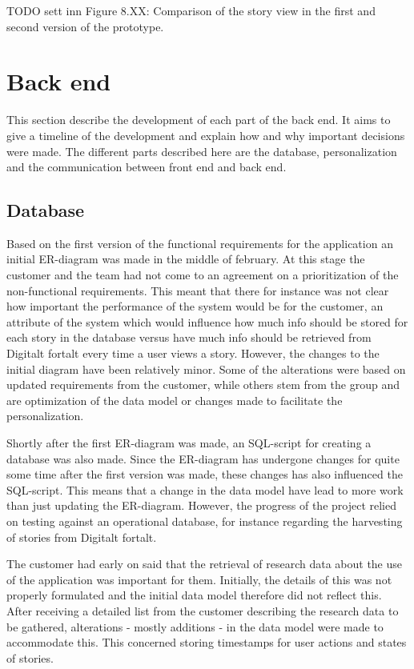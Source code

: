 TODO sett inn Figure 8.XX: Comparison of the story view in the first and second version of the prototype.\newline

\section{Back end}

This section describe the development of each part of the back end. It aims to give a timeline of the development and explain how and why important decisions were made. The different parts described here are the database, personalization and the communication between front end and back end. 

\subsection{Database}

Based on the first version of the functional requirements for the application an initial ER-diagram was made in the middle of february. At this stage the customer and the team had not come to an agreement on a prioritization of the non-functional requirements. This meant that there for instance was not clear how important the performance of the system would be for the customer, an attribute of the system which would influence how much info should be stored for each story in the database versus have much info should be retrieved from Digitalt fortalt every time a user views a story. However, the changes to the initial diagram have been relatively minor. Some of the alterations were based on updated requirements from the customer, while others stem from the group and are optimization of the data model or changes made to facilitate the personalization. \newline

Shortly after the first ER-diagram was made, an SQL-script for creating a database was also made. Since the ER-diagram has undergone changes for quite some time after the first version was made, these changes has also influenced the SQL-script. This means that a change in the data model have lead to more work than just updating the ER-diagram. However, the progress of the project relied on testing against an operational database, for instance regarding the harvesting of stories from Digitalt fortalt. \newline

The customer had early on said that the retrieval of research data about the use of the application was important for them. Initially, the details of this was not properly formulated and the initial data model therefore did not reflect this. After receiving a detailed list from the customer describing the research data to be gathered, alterations - mostly additions - in the data model were made to accommodate this. This concerned storing timestamps for user actions and states of stories.  \newline

